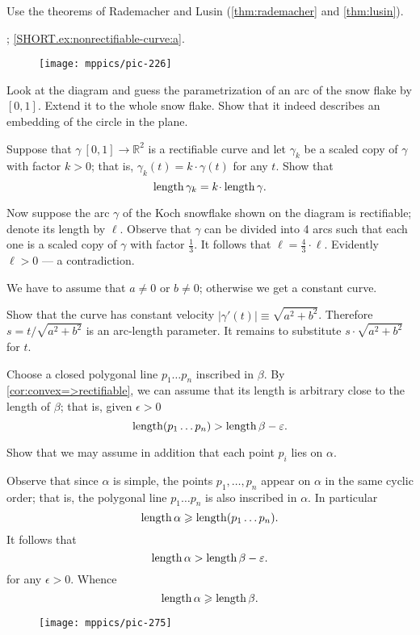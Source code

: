  Use the theorems of Rademacher and Lusin (\ref{thm:rademacher} and \ref{thm:lusin}).

\parbf{\ref{ex:nonrectifiable-curve}}; \ref{SHORT.ex:nonrectifiable-curve:a}.
\begin{figure}[h!]
\vskip-0mm
\centering
\texttt{[image: mppics/pic-226]}
\vskip0mm
\end{figure}
Look at the diagram and guess the parametrization of an arc of the snow flake by $[0,1]$.
Extend it to the whole snow flake.
Show that it indeed describes an embedding of the circle in the plane.

Suppose that $\gamma\:[0,1]\to\mathbb{R}^2$ is a rectifiable curve and let $\gamma_k$ be a scaled copy of $\gamma$ with factor $k>0$;
that is, $\gamma_k(t)=k\cdot\gamma(t)$ for any $t$.
Show that 
\[\length\gamma_k=k\cdot\length \gamma.\]

Now suppose the arc $\gamma$ of the Koch snowflake shown on the diagram is rectifiable; denote its length by $\ell$.
Observe that $\gamma$ can be divided into 4 arcs such that each one is a scaled copy of $\gamma$ with factor $\tfrac13$.
It follows that $\ell=\tfrac43\cdot\ell$.
Evidently $\ell>0$ --- a contradiction.

We have to assume that $a\ne 0$ or $b\ne0$;
otherwise we get a constant curve.

Show that the curve has constant velocity $|\gamma'(t)|\equiv \sqrt{a^2+b^2}$.
Therefore $s=t/\sqrt{a^2+b^2}$ is an arc-length parameter.
It remains to substitute $s\cdot \sqrt{a^2+b^2}$ for $t$.


Choose a closed polygonal line $p_1\dots p_n$ inscribed in $\beta$.
By \ref{cor:convex=>rectifiable}, we can assume that its length is arbitrary close to the length of $\beta$;
that is, given $\epsilon>0$ 
\[\mathop{\rm length}\nolimits (p_1\dots p_n)>\mathop{\rm length}\nolimits\beta-\varepsilon.\]

Show that we may assume in addition that each point $p_i$ lies on $\alpha$.

Observe that since $\alpha$ is simple, the points $p_1,\dots,p_n$ appear on $\alpha$ in the same cyclic order;
that is, the polygonal line $p_1\dots p_n$ is also inscribed in $\alpha$.
In particular 
\[\mathop{\rm length}\nolimits\alpha\geqslant \mathop{\rm length}\nolimits (p_1\dots p_n).\]
It follows that 
\[\mathop{\rm length}\nolimits\alpha>\mathop{\rm length}\nolimits\beta-\varepsilon.\]
for any $\epsilon>0$.
Whence 
\[\mathop{\rm length}\nolimits\alpha\geqslant\mathop{\rm length}\nolimits\beta.\]

\begin{wrapfigure}{r}{25 mm}
\vskip-0mm
\centering
\texttt{[image: mppics/pic-275]}
\vskip0mm
\end{wrapfigure}

